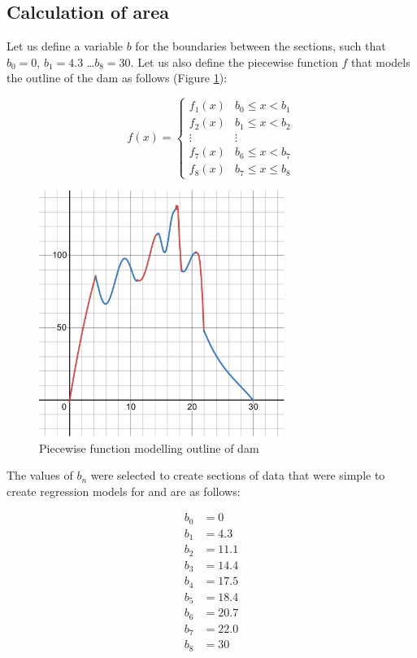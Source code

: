 \documentclass[a4paper]{article}
\theoremstyle{definition}
\begin{document}
    \subsection{Calculation of area}

        Let us define a variable $b$ for the boundaries between the sections, such that $b_0 = 0$, $b_1 = 4.3$ \ldots $b_8 = 30$. Let us also  define the piecewise function $f$ that models the outline of the dam as follows (Figure \ref{figDamFunction}):

        \begin{equation} %
            f(x) = \begin{cases}
                f_1(x) & b_0 \leq x < b_1 \\
                f_2(x) & b_1 \leq x < b_2 \\
                \vdots & \vdots \\
                f_7(x) & b_6 \leq x < b_7 \\
                f_8(x) & b_7 \leq x \leq b_8
            \end{cases}
            \label{eqnPiecewiseFunction}
        \end{equation}

        \begin{figure} %
            \centering
            \includegraphics[width = 8cm]{damFunction.pdf}
            \caption{Piecewise function modelling outline of dam}
            \label{figDamFunction}
        \end{figure}

        The values of $b_n$ were selected to create sections of data that were simple to create regression models for and are as follows:

        \begin{align*} %
            b_0 &= 0 \\
            b_1 &= 4.3 \\
            b_2 &= 11.1 \\
            b_3 &= 14.4 \\
            b_4 &= 17.5 \\
            b_5 &= 18.4 \\
            b_6 &= 20.7 \\
            b_7 &= 22.0 \\
            b_8 &= 30
        \end{align*}
\end{document}
